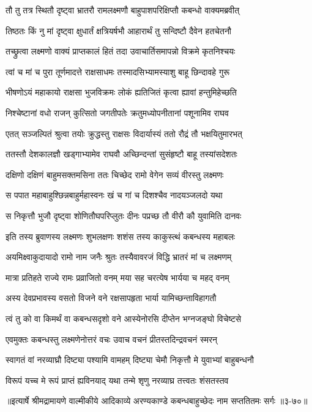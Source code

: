 
\twolineshloka
{तौ तु तत्र स्थितौ दृष्ट्वा भ्रातरौ रामलक्ष्मणौ}
{बाहुपाशपरिक्षिप्तौ कबन्धो वाक्यमब्रवीत्} %

\twolineshloka
{तिष्ठतः किं नु मां दृष्ट्वा क्षुधार्तं क्षत्रियर्षभौ}
{आहारार्थं तु सन्दिष्टौ दैवेन हतचेतनौ} %

\twolineshloka
{तच्छ्रुत्वा लक्ष्मणो वाक्यं प्राप्तकालं हितं तदा}
{उवाचार्तिसमापन्नो विक्रमे कृतनिश्चयः} %

\twolineshloka
{त्वां च मां च पुरा तूर्णमादत्ते राक्षसाधमः}
{तस्मादसिभ्यामस्याशु बाहू छिन्दावहे गुरू} %

\twolineshloka
{भीषणोऽयं महाकायो राक्षसा भुजविक्रमः}
{लोकं ह्यतिजितं कृत्वा ह्यावां हन्तुमिहेच्छति} %

\twolineshloka
{निश्चेष्टानां वधो राजन् कुत्सितो जगतीपतेः}
{क्रतुमध्योपनीतानां पशूनामिव राघव} %

\twolineshloka
{एतत् सञ्जल्पितं श्रुत्वा तयोः क्रुद्धस्तु राक्षसः}
{विदार्यास्यं ततो रौद्रं तौ भक्षयितुमारभत्} %

\twolineshloka
{ततस्तौ देशकालज्ञौ खड्गाभ्यामेव राघवौ}
{अच्छिन्दन्तां सुसंहृष्टौ बाहू तस्यांसदेशतः} %

\twolineshloka
{दक्षिणो दक्षिणं बाहुमसक्तमसिना ततः}
{चिच्छेद रामो वेगेन सव्यं वीरस्तु लक्ष्मणः} %

\twolineshloka
{स पपात महाबाहुश्छिन्नबाहुर्महास्वनः}
{खं च गां च दिशश्चैव नादयञ्जलदो यथा} %

\twolineshloka
{स निकृत्तौ भुजौ दृष्ट्वा शोणितौघपरिप्लुतः}
{दीनः पप्रच्छ तौ वीरौ कौ युवामिति दानवः} %

\twolineshloka
{इति तस्य ब्रुवाणस्य लक्ष्मणः शुभलक्षणः}
{शशंस तस्य काकुस्त्थं कबन्धस्य महाबलः} %

\twolineshloka
{अयमिक्ष्वाकुदायादो रामो नाम जनैः श्रुतः}
{तस्यैवावरजं विद्धि भ्रातरं मां च लक्ष्मणम्} %

\twolineshloka
{मात्रा प्रतिहते राज्ये रामः प्रव्राजितो वनम्}
{मया सह चरत्येष भार्यया च महद् वनम्} %

\twolineshloka
{अस्य देवप्रभावस्य वसतो विजने वने}
{रक्षसापहृता भार्या यामिच्छन्ताविहागतौ} %

\twolineshloka
{त्वं तु को वा किमर्थं वा कबन्धसदृशो वने}
{आस्येनोरसि दीप्तेन भग्नजङ्घो विचेष्टसे} %

\twolineshloka
{एवमुक्तः कबन्धस्तु लक्ष्मणेनोत्तरं वचः}
{उवाच वचनं प्रीतस्तदिन्द्रवचनं स्मरन्} %

\twolineshloka
{स्वागतं वां नरव्याघ्रौ दिष्ट्या पश्यामि वामहम्}
{दिष्ट्या चेमौ निकृत्तौ मे युवाभ्यां बाहुबन्धनौ} %

\twolineshloka
{विरूपं यच्च मे रूपं प्राप्तं ह्यविनयाद् यथा}
{तन्मे शृणु नरव्याघ्र तत्त्वतः शंसतस्तव} %


॥इत्यार्षे श्रीमद्रामायणे वाल्मीकीये आदिकाव्ये अरण्यकाण्डे कबन्धबाहुच्छेदः नाम सप्ततितमः सर्गः ॥३-७०॥
